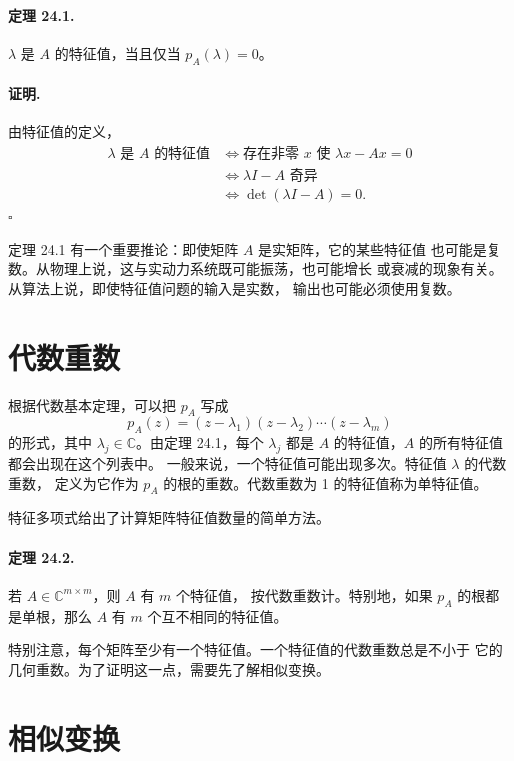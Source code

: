 \documentclass[UTF8,fontset=none,12pt]{ctexart}
\begin{document}
\paragraph{定理 24.1.}
$\lambda$ 是 $A$ 的特征值，当且仅当 $p_A(\lambda)=0$。

\paragraph{证明.}
由特征值的定义，
\[
\begin{aligned}
\lambda\text{ 是 }A\text{ 的特征值}
&\Longleftrightarrow
\text{存在非零 }x\text{ 使 }\lambda x-Ax=0\\
&\Longleftrightarrow \lambda I-A\text{ 奇异}\\
&\Longleftrightarrow \det(\lambda I-A)=0.
\end{aligned}
\]
\hfill$\square$

定理 24.1 有一个重要推论：即使矩阵 $A$ 是实矩阵，它的某些特征值
也可能是复数。从物理上说，这与实动力系统既可能振荡，也可能增长
或衰减的现象有关。从算法上说，即使特征值问题的输入是实数，
输出也可能必须使用复数。

\section*{代数重数}

根据代数基本定理，可以把 $p_A$ 写成
\begin{equation}
p_A(z)=(z-\lambda_1)(z-\lambda_2)\cdots(z-\lambda_m)
\tag{24.6}
\end{equation}
的形式，其中 $\lambda_j\in\mathbb{C}$。由定理 24.1，每个
$\lambda_j$ 都是 $A$ 的特征值，$A$ 的所有特征值都会出现在这个列表中。
一般来说，一个特征值可能出现多次。特征值 $\lambda$ 的代数重数，
定义为它作为 $p_A$ 的根的重数。代数重数为 1 的特征值称为单特征值。

特征多项式给出了计算矩阵特征值数量的简单方法。

\paragraph{定理 24.2.}
若 $A\in\mathbb{C}^{m\times m}$，则 $A$ 有 $m$ 个特征值，
按代数重数计。特别地，如果 $p_A$ 的根都是单根，那么 $A$ 有
$m$ 个互不相同的特征值。

特别注意，每个矩阵至少有一个特征值。一个特征值的代数重数总是不小于
它的几何重数。为了证明这一点，需要先了解相似变换。

\section*{相似变换}
\end{document}
